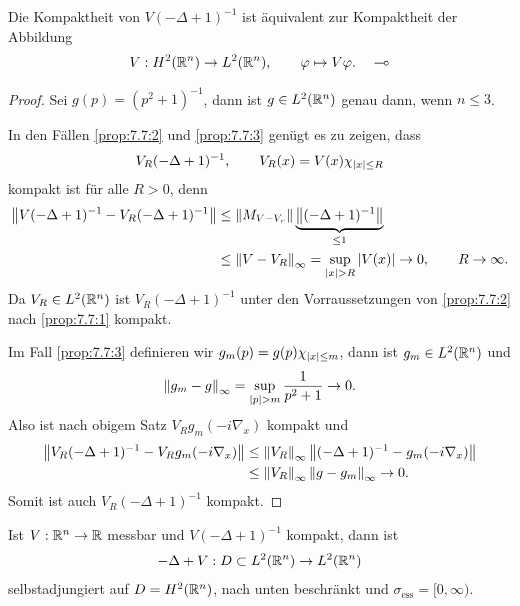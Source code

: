\begin{bem*}
Die Kompaktheit von $V(-\Delta+1)^{-1}$ ist äquivalent zur Kompaktheit der
Abbildung
\begin{align*}
V : H^2(\mathbb{R}^n)\to L^2(\mathbb{R}^n),\qquad \varphi\mapsto V\varphi.\quad\multimap
\end{align*}
\end{bem*}

\begin{proof}
Sei $g(p) = (p^2+1)^{-1}$, dann ist $g\in L^2(\mathbb{R}^n)$ genau dann, wenn $n\le 3$.

In den Fällen \ref{prop:7.7:2} und \ref{prop:7.7:3} genügt es zu zeigen, dass
\begin{align*}
V_R(-\Delta + 1)^{-1},\qquad V_R(x) = V(x)\chi_{\left|x\right|\le R}
\end{align*}
kompakt ist für alle $R>0$, denn
\begin{align*}
\norm{V(-\Delta+1)^{-1}-V_R(-\Delta+1)^{-1}}
&\le \norm{M_{V-V_r}}\underbrace{\norm{(-\Delta+1)^{-1}}}_{\le 1}\\
&\le \norm{V-V_R}_\infty = \sup_{\abs{x}>R} \abs{V(x)}\to 0,\qquad R\to \infty. 
\end{align*}
Da $V_R\in L^2(\mathbb{R}^n)$ ist $V_R(-\Delta + 1)^{-1}$ unter den Vorraussetzungen von
\ref{prop:7.7:2} nach \ref{prop:7.7:1} kompakt.

Im Fall \ref{prop:7.7:3} definieren wir $g_m(p) = g(p)\chi_{\left|x\right|\le m}$, dann
ist $g_m\in L^2(\mathbb{R}^n)$ und
\begin{align*}
\norm{g_m-g}_\infty = \sup_{\abs{p}>m} \frac{1}{p^2+1} \to 0.
\end{align*}
Also ist nach obigem Satz $V_Rg_m(-i\nabla_x)$ kompakt und
\begin{align*}
\left\|V_R(-\Delta+1)^{-1} - V_Rg_m(-i\nabla_x)\right\| &\le
\left\|V_R\right\|_\infty \left\|(-\Delta+1)^{-1} - g_m(-i\nabla_x)\right\|\\
&\le \left\|V_R\right\|_\infty \left\|g-g_m\right\|_\infty \to 0.
\end{align*}
Somit ist auch $V_R(-\Delta+1)^{-1}$ kompakt.\qedhere
\end{proof}

\begin{thm}
\label{prop:7.8}
Ist $V:\mathbb{R}^n\to\mathbb{R}$ messbar und $V(-\Delta+1)^{-1}$ kompakt, dann ist
\begin{align*}
-\Delta + V : D\subset L^2(\mathbb{R}^n)\to L^2(\mathbb{R}^n)
\end{align*}
selbstadjungiert auf $D=H^2(\mathbb{R}^n)$, nach unten beschränkt und
$\sigma_\mathrm{ess} = [0,\infty)$.\fishhere
\end{thm}

